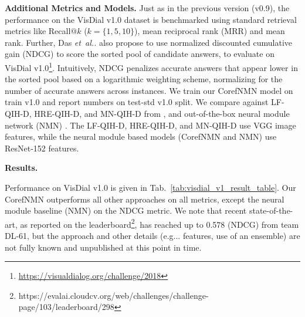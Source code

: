 \documentclass[runningheads]{llncs}
\makeatletter
\DeclareRobustCommand\onedot{\futurelet\@let@token\@onedot}
\def\@onedot{\ifx\@let@token.\else.\null\fi\xspace}
\def\eg{e.g\onedot} \def\Eg{E.g\onedot}
\def\etal{\textit{et~al\onedot}} \def\iid{i.i.d\onedot}
\newcommand{\nmn}{CorefNMN\xspace}
\newcommand{\reftab}[1]{Tab.~\ref{#1}}
\makeatother
\begin{document}
\noindent
\textbf{Additional Metrics and Models.}
Just as in the previous version (v0.9), the performance on the VisDial v1.0 dataset 
is benchmarked using standard retrieval metrics like Recall$@k$ ($k=\{1, 5, 10\}$),
mean reciprocal rank (MRR) and mean rank.
Further, Das \etal \cite{visdial} also propose to use normalized 
discounted cumulative gain (NDCG) to score the sorted pool of candidate
answers,
to evaluate on VisDial v1.0\footnote{\url{https://visualdialog.org/challenge/2018}}.
Intuitively, NDCG penalizes accurate answers that appear lower in the 
sorted pool based on a logarithmic weighting scheme, normalizing for 
the number of accurate answers across instances.
We train our \nmn{} model on train v1.0 and report numbers on test-std v1.0 split.
We compare against LF-QIH-D, HRE-QIH-D, and MN-QIH-D from \cite{visdial}, and
out-of-the-box neural module network (NMN) \cite{hu2017learning}.
The LF-QIH-D, HRE-QIH-D, and MN-QIH-D use VGG \cite{simonyan_iclr15} 
image features, while the neural module based models (\nmn{} and NMN) 
use ResNet-152 \cite{he16cvpr} features.

\noindent
\textbf{Results.}

Performance on VisDial v1.0 is given in \reftab{tab:visdial_v1_result_table}.
Our \nmn{} outperforms all other approaches on all metrics, except the neural module
baseline (NMN) on the NDCG metric.
We note that recent state-of-the-art, as reported on the leaderboard\footnote{https://evalai.cloudcv.org/web/challenges/challenge-page/103/leaderboard/298}, 
has reached up to 0.578 (NDCG) from team DL-61, but the approach and 
other details (\eg. features, use of an ensemble) are not fully known and unpublished at 
this point in time.
\end{document}
